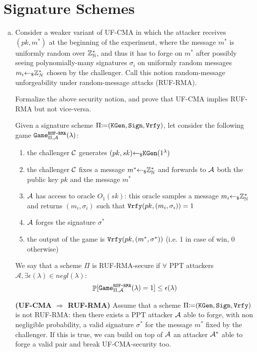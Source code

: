 \section{Signature Schemes}
\begin{enumerate}[(a)]
	\item Consider a weaker variant of UF-CMA in which the attacker receives $(pk, m^*)$ at the beginning of the experiment, where the message $m^*$ is uniformly random over ${\mathbb Z}^*_{\mathbb N}$, and thus it has to forge on $m^*$ after possibly seeing polynomially-many signatures $\sigma_i$	on uniformly random messages $m_i {\leftarrow_\$} {\mathbb Z}^*_N$ chosen by the challenger. Call this notion random-message unforgeability under random-message attacks (RUF-RMA).

	      Formalize the above security notion, and prove that UF-CMA implies RUF-RMA but not vice-versa.

	      \begin{solution}
		      Given a signature scheme $\Pi {\coloneqq} (\texttt{KGen}, \texttt{Sign}, \texttt{Vrfy})$, let consider the following game $\texttt{Game}_{\Pi, \mathcal{A}}^{\texttt{RUF-RMA}}(\lambda)$:
		      \begin{enumerate}
			      \item the challenger $\mathcal{C}$ generates $(pk, sk) {\leftarrow_\$} \texttt{KGen}(1^\lambda)$
			      \item the challenger $\mathcal{C}$ fixes a message $m^* {\leftarrow_\$} {\mathbb Z}^*_{\mathbb N}$ and forwards to $\mathcal{A}$ both the public key $pk$ and the message $m^*$
			      \item $\mathcal{A}$ has access to oracle $O_1(sk)$: this oracle samples a message $m_i {\leftarrow_\$} {\mathbb Z}_{\mathbb N}^*$ and returns $(m_i, \sigma_i)$ such that $\texttt{Vrfy}(pk, (m_i, \sigma_i)) = 1$
			      \item $\mathcal{A}$ forges the signature $\sigma^*$
			      \item the output of the game is $\texttt{Vrfy}(pk, (m^*, \sigma^*))$ (i.e. 1 in case of win, 0 otherwise)
		      \end{enumerate}
		      We say that a scheme $\Pi$ is RUF-RMA-secure if $\forall$ PPT attackers $\mathcal{A}, \exists \epsilon(\lambda) \in negl(\lambda)$:
		      \[\mathop{\mathbb P}[\texttt{Game}_{\Pi, \mathcal{A}}^{\texttt{RUF-RMA}}(\lambda) = 1] \le \epsilon(\lambda) \]

		      \bigskip
		      \textbf{(UF-CMA $\Rightarrow$ RUF-RMA)} Assume that a scheme $\Pi {\coloneqq} (\texttt{KGen}, \texttt{Sign}, \texttt{Vrfy})$ is not RUF-RMA: then there exists a PPT attacker $\mathcal{A}$ able to forge, with non negligible probability, a valid signature $\sigma^*$ for the message $m^*$ fixed by the challenger. If this is true, we can build on top of $\mathcal{A}$ an attacker $\mathcal{A}^*$ able to forge a valid pair and break UF-CMA-security too.


\end{solution}
\end{enumerate}
